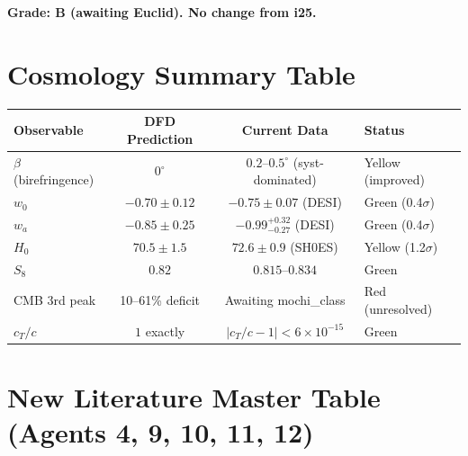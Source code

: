 \documentclass[11pt,a4paper]{article}
\begin{document}
\textbf{Grade: B (awaiting Euclid). No change from i25.}

\section{Cosmology Summary Table}

\begin{center}
\begin{tabular}{lccl}
\toprule
\textbf{Observable} & \textbf{DFD Prediction} & \textbf{Current Data} & \textbf{Status} \\
\midrule
$\beta$ (birefringence) & $0^\circ$ & $0.2$--$0.5^\circ$ (syst-dominated) & Yellow (improved) \\
$w_0$ & $-0.70 \pm 0.12$ & $-0.75 \pm 0.07$ (DESI) & Green (0.4$\sigma$) \\
$w_a$ & $-0.85 \pm 0.25$ & $-0.99^{+0.32}_{-0.27}$ (DESI) & Green (0.4$\sigma$) \\
$H_0$ & $70.5 \pm 1.5$ & $72.6 \pm 0.9$ (SH0ES) & Yellow (1.2$\sigma$) \\
$S_8$ & $0.82$ & $0.815$--$0.834$ & Green \\
CMB 3rd peak & 10--61\% deficit & Awaiting mochi\_class & Red (unresolved) \\
$c_T/c$ & $1$ exactly & $|c_T/c - 1| < 6\times10^{-15}$ & Green \\
\bottomrule
\end{tabular}
\end{center}

\section{New Literature Master Table (Agents 4, 9, 10, 11, 12)}
\end{document}
